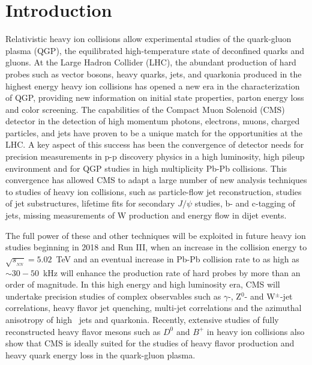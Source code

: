 \section{Introduction}
\label{sec:intro}

Relativistic heavy ion collisions allow experimental studies of the quark-gluon plasma (QGP), the equilibrated high-temperature state of deconfined quarks and gluons. At the Large Hadron Collider (LHC), the abundant production of hard probes such as vector bosons, heavy quarks, jets, and quarkonia produced in the highest energy heavy ion collisions has opened a new era in the characterization of QGP, providing new information on initial state properties, parton energy loss and color screening. The capabilities of the Compact Muon Solenoid (CMS) detector in the detection of high momentum photons, electrons, muons, charged particles, and jets have proven to be a unique match for the opportunities at the LHC. A key aspect of this success has been the convergence of detector needs for precision measurements in p-p discovery physics in a high luminosity, high pileup environment and for QGP studies in high multiplicity Pb-Pb collisions. This convergence has allowed CMS to adapt a large number of new analysis techniques to studies of heavy ion collisions, such as particle-flow jet reconstruction, studies of jet substructures, lifetime fits for secondary $J/\psi$ studies,  b- and c-tagging of jets, missing \pt measurements of W production and energy flow in dijet events. 

The full power of these and other techniques will be exploited in future heavy ion studies beginning in 2018 and Run III, when an increase in the collision energy to $\sqrt{s_{_{NN}}} = 5.02$~TeV and an eventual increase in Pb-Pb collision rate to as high as $\sim 30-50$~kHz will enhance the production rate of hard probes by more than an order of magnitude. In this high energy and high luminosity era, CMS will undertake precision studies of complex observables such as $\gamma$-, Z$^0$- and W$^\pm$-jet correlations, heavy flavor jet quenching, multi-jet correlations and the azimuthal anisotropy of high \pt\ jets and quarkonia. Recently, extensive studies of fully reconstructed heavy flavor mesons such as $D^0$ and $B^+$ in heavy ion collisions also show that CMS is ideally suited for the studies of heavy flavor production and heavy quark energy loss in the quark-gluon plasma.

